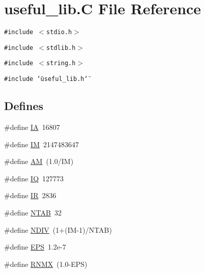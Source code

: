 \hypertarget{useful__lib_8C}{
\section{useful\_\-lib.C File Reference}
\label{useful__lib_8C}
}
{\tt \#include $<$stdio.h$>$}\par
{\tt \#include $<$stdlib.h$>$}\par
{\tt \#include $<$string.h$>$}\par
{\tt \#include \char`\"{}useful\_\-lib.h\char`\"{}}\par
\subsection*{Defines}
\begin{CompactItemize}
\item 
\#define \hyperlink{useful__lib_8C_a0}{IA}\ 16807
\item 
\#define \hyperlink{useful__lib_8C_a1}{IM}\ 2147483647
\item 
\#define \hyperlink{useful__lib_8C_a2}{AM}\ (1.0/IM)
\item 
\#define \hyperlink{useful__lib_8C_a3}{IQ}\ 127773
\item 
\#define \hyperlink{useful__lib_8C_a4}{IR}\ 2836
\item 
\#define \hyperlink{useful__lib_8C_a5}{NTAB}\ 32
\item 
\#define \hyperlink{useful__lib_8C_a6}{NDIV}\ (1+(IM-1)/NTAB)
\item 
\#define \hyperlink{useful__lib_8C_a7}{EPS}\ 1.2e-7
\item 
\#define \hyperlink{useful__lib_8C_a8}{RNMX}\ (1.0-EPS)
\end{CompactItemize}
